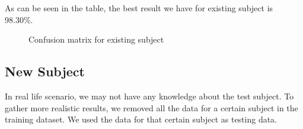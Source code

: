 \documentclass{article} %
\begin{document}
As can be seen in the table, the best result we have for existing subject is 98.30\%.

\begin{figure}[hbt]
\begin{center}
\end{center}
\caption{Confusion matrix for existing subject}
\end{figure}


\subsection{New Subject}

In real life scenario, we may not have any knowledge about the test subject. To gather more realistic results, we removed all the data for a certain subject in the training dataset. We used the data for that certain subject as testing data.  
\end{document}
